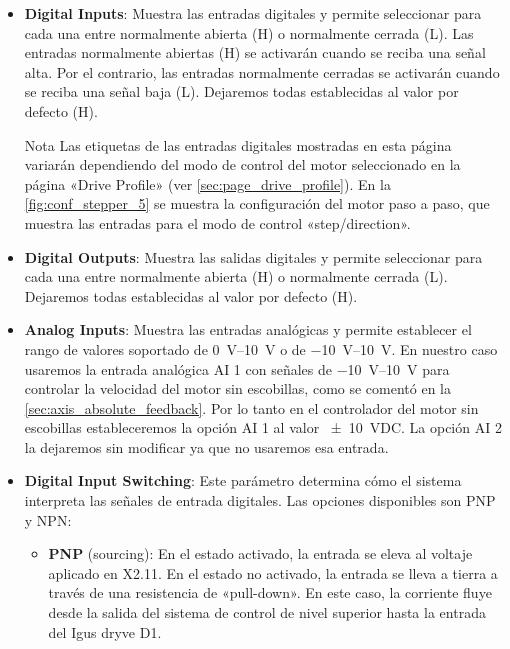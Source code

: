 \documentclass[english,spanish,a4paper,11pt]{article}
\begin{document}
\begin{itemize}
    \item \textbf{Digital Inputs}: Muestra las entradas digitales y permite seleccionar para cada una entre normalmente abierta (H) o normalmente cerrada (L). Las entradas normalmente abiertas (H) se activarán cuando se reciba una señal alta. Por el contrario, las entradas normalmente cerradas se activarán cuando se reciba una señal baja (L). Dejaremos todas establecidas al valor por defecto (H).

    \begin{admonition}{Nota}
        Las etiquetas de las entradas digitales mostradas en esta página variarán dependiendo del modo de control del motor seleccionado en la página «Drive Profile» (ver \cref{sec:page_drive_profile}). En la \cref{fig:conf_stepper_5} se muestra la configuración del motor paso a paso, que muestra las entradas para el modo de control «step/direction».
    \end{admonition}

    \item \textbf{Digital Outputs}: Muestra las salidas digitales y permite seleccionar para cada una entre normalmente abierta (H) o normalmente cerrada (L). Dejaremos todas establecidas al valor por defecto (H).

    \item \textbf{Analog Inputs}: Muestra las entradas analógicas y permite establecer el rango de valores soportado de \qtyrange{0}{10}{\V} o de \qtyrange{-10}{10}{\V}. En nuestro caso usaremos la entrada analógica AI 1 con señales de \qtyrange{-10}{10}{\V} para controlar la velocidad del motor sin escobillas, como se comentó en la \cref{sec:axis_absolute_feedback}. Por lo tanto en el controlador del motor sin escobillas estableceremos la opción AI 1 al valor \qty{\pm10}{VDC}. La opción AI 2 la dejaremos sin modificar ya que no usaremos esa entrada.

    \item \textbf{Digital Input Switching}: Este parámetro determina cómo el sistema interpreta las señales de entrada digitales. Las opciones disponibles son PNP y NPN:
    \begin{itemize}
        \item \textbf{PNP} (sourcing): En el estado activado, la entrada se eleva al voltaje aplicado en X2.11. En el estado no activado, la entrada se lleva a tierra a través de una resistencia de «pull-down». En este caso, la corriente fluye desde la salida del sistema de control de nivel superior hasta la entrada del Igus dryve D1.
        

\end{itemize}
\end{itemize}
\end{document}

